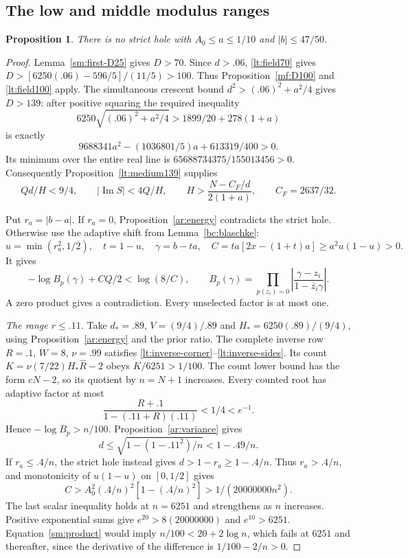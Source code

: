 \documentclass[11pt,reqno]{amsart}
\numberwithin{equation}{section}
\newtheorem{proposition}[theorem]{Proposition}
\theoremstyle{definition}
\theoremstyle{remark}
\renewcommand{\Im}{\operatorname{Im}}
\begin{document}
\subsection{The low and middle modulus ranges}

\begin{proposition}\label{sm:low-middle}
There is no strict hole with $A_0\le a\le1/10$ and $|b|\le47/50$.
\end{proposition}
\begin{proof}
Lemma~\ref{sm:first-D25} gives $D>70$. Since $d>.06$,
\eqref{lt:field70} gives $D>[6250(.06)-596/5]/(11/5)>100$.
Thus Proposition~\ref{mf:D100} and \eqref{lt:field100} apply.
The simultaneous crescent bound
$d^2>(.06)^2+a^2/4$ gives $D>139$: after positive squaring the
required inequality
\[
 6250\sqrt{(.06)^2+a^2/4}>1899/20+278(1+a)
\]
is exactly
\[
 9688341a^2-(1036801/5)a+613319/400>0.
\]
Its minimum over the entire real line is
$65688734375/155013456>0$.
Consequently Proposition~\ref{lt:medium139} supplies
\begin{equation}\label{sm:middle-input}
 Qd/H<9/4,\qquad |\Im S|<4Q/H,\qquad
 H>\frac{N-C_F/d}{2(1+a)},\qquad C_F=2637/32.
\end{equation}

Put $r_a=|b-a|$. If $r_a=0$, Proposition~\ref{ar:energy}
contradicts the strict hole. Otherwise use the adaptive
shift from Lemma~\ref{bc:blaschke}:
\[
 u=\min(r_a^2,1/2),\quad t=1-u,\quad
 \gamma=b-ta,\quad C=ta[2x-(1+t)a]\ge a^2u(1-u)>0.
\]
It gives
\begin{equation}\label{sm:product}
 -\log B_p(\gamma)+CQ/2<\log(8/C),\qquad
 B_p(\gamma)=\prod_{p(z_i)=0}
              \left|\frac{\gamma-z_i}{1-\overline{z_i}\gamma}\right|.
\end{equation}
A zero product gives a contradiction. Every unselected factor
is at most one.

\smallskip\noindent\emph{The range $r\le.11$.}
Take $d_*=.89$, $V=(9/4)/.89$ and $H_*=6250(.89)/(9/4)$,
using Proposition~\ref{ar:energy} and the prior ratio.
The complete inverse row $R=.1$, $W=8$, $\nu=.99$ satisfies
\eqref{lt:inverse-corner}--\eqref{lt:inverse-sides}. Its count
$K=\nu(7/22)H_*\widehat R-2$ obeys $K/6251>1/100$.
The count lower bound has the form $cN-2$, so its quotient by $n=N+1$
increases. Every counted root has adaptive factor at most
\[
 \frac{R+.1}{1-(.11+R)(.11)}<1/4<e^{-1}.
\]
Hence $-\log B_p>n/100$. Proposition~\ref{ar:variance} gives
\[
 d\le\sqrt{1-(1-.11^2)/n}<1-.49/n.
\]
If $r_a\le.4/n$, the strict hole instead gives
$d>1-r_a\ge1-.4/n$. Thus $r_a>.4/n$, and monotonicity of
$u(1-u)$ on $[0,1/2]$ gives
\[
 C>A_0^2(.4/n)^2[1-(.4/n)^2]>1/(20000000n^2).
\]
The last scalar inequality holds at $n=6251$ and strengthens as $n$
increases. Positive exponential sums give $e^{20}>8(20000000)$
and $e^{10}>6251$. Equation~\eqref{sm:product} would imply
$n/100<20+2\log n$, which fails at $6251$ and thereafter, since
the derivative of the difference is $1/100-2/n>0$.


\end{proof}
\end{document}
